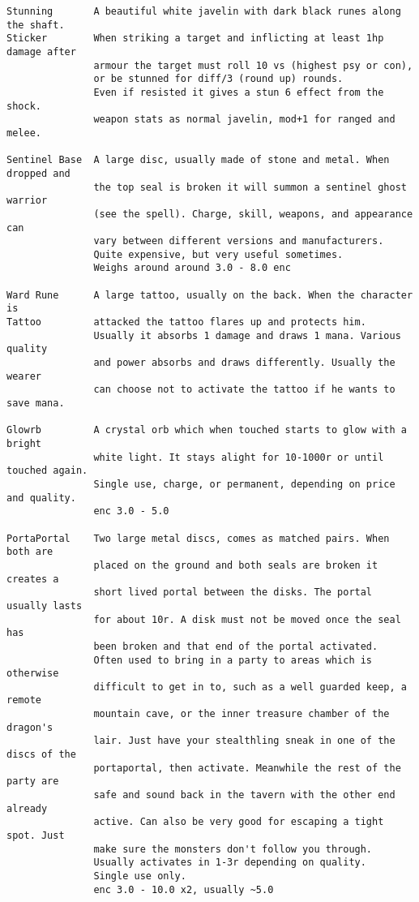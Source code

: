 \begin{verbatim}
Stunning       A beautiful white javelin with dark black runes along the shaft.
Sticker        When striking a target and inflicting at least 1hp damage after
               armour the target must roll 10 vs (highest psy or con),
               or be stunned for diff/3 (round up) rounds.
               Even if resisted it gives a stun 6 effect from the shock.
               weapon stats as normal javelin, mod+1 for ranged and melee.

Sentinel Base  A large disc, usually made of stone and metal. When dropped and
               the top seal is broken it will summon a sentinel ghost warrior
               (see the spell). Charge, skill, weapons, and appearance can
               vary between different versions and manufacturers.
               Quite expensive, but very useful sometimes.
               Weighs around around 3.0 - 8.0 enc

Ward Rune      A large tattoo, usually on the back. When the character is
Tattoo         attacked the tattoo flares up and protects him.
               Usually it absorbs 1 damage and draws 1 mana. Various quality
               and power absorbs and draws differently. Usually the wearer
               can choose not to activate the tattoo if he wants to save mana.

Glowrb         A crystal orb which when touched starts to glow with a bright
               white light. It stays alight for 10-1000r or until touched again.
               Single use, charge, or permanent, depending on price and quality.
               enc 3.0 - 5.0

PortaPortal    Two large metal discs, comes as matched pairs. When both are
               placed on the ground and both seals are broken it creates a
               short lived portal between the disks. The portal usually lasts
               for about 10r. A disk must not be moved once the seal has
               been broken and that end of the portal activated.
               Often used to bring in a party to areas which is otherwise
               difficult to get in to, such as a well guarded keep, a remote
               mountain cave, or the inner treasure chamber of the dragon's
               lair. Just have your stealthling sneak in one of the discs of the
               portaportal, then activate. Meanwhile the rest of the party are
               safe and sound back in the tavern with the other end already
               active. Can also be very good for escaping a tight spot. Just
               make sure the monsters don't follow you through.
               Usually activates in 1-3r depending on quality.
               Single use only.
               enc 3.0 - 10.0 x2, usually ~5.0


\end{verbatim}

